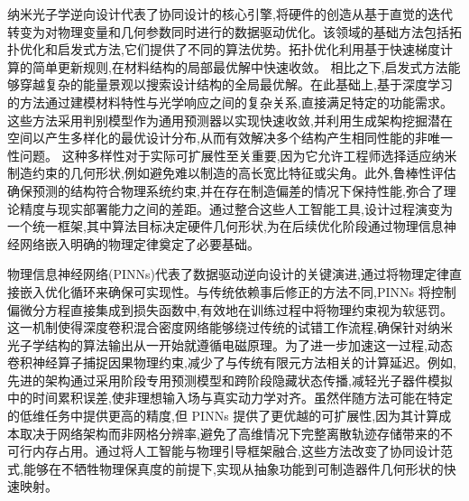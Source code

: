 \documentclass[11pt]{article}
\begin{document}
纳米光子学逆向设计代表了协同设计的核心引擎,将硬件的创造从基于直觉的迭代转变为对物理变量和几何参数同时进行的数据驱动优化。该领域的基础方法包括拓扑优化和启发式方法,它们提供了不同的算法优势。拓扑优化利用基于快速梯度计算的简单更新规则,在材料结构的局部最优解中快速收敛。\citep{doi_10_1115_1_4065902_bf83da4b} \citep{doi_10_32604_cmes_2024_052620_6f4a92ee} 相比之下,启发式方法能够穿越复杂的能量景观以搜索设计结构的全局最优解。在此基础上,基于深度学习的方法通过建模材料特性与光学响应之间的复杂关系,直接满足特定的功能需求。这些方法采用判别模型作为通用预测器以实现快速收敛,并利用生成架构挖掘潜在空间以产生多样化的最优设计分布,从而有效解决多个结构产生相同性能的非唯一性问题。\citep{doi_10_1364_cleo_at_2024_jth2a_48_87abd6b5} 这种多样性对于实际可扩展性至关重要,因为它允许工程师选择适应纳米制造约束的几何形状,例如避免难以制造的高长宽比特征或尖角。此外,鲁棒性评估确保预测的结构符合物理系统约束,并在存在制造偏差的情况下保持性能,弥合了理论精度与现实部署能力之间的差距。通过整合这些人工智能工具,设计过程演变为一个统一框架,其中算法目标决定硬件几何形状,为在后续优化阶段通过物理信息神经网络嵌入明确的物理定律奠定了必要基础。\citep{doi_10_1515_nanoph_2021_0660_2d91a441} \citep{doi_10_29026_oes_2022_210012_27973a69}

物理信息神经网络(PINNs)代表了数据驱动逆向设计的关键演进,通过将物理定律直接嵌入优化循环来确保可实现性。与传统依赖事后修正的方法不同,PINNs 将控制偏微分方程直接集成到损失函数中,有效地在训练过程中将物理约束视为软惩罚。\citep{doi_10_1007_s10444_023_10065_9_12bf0652} \citep{s2_cc39d5405a933620426d86298fa8fe4cd51915c5_27626ee3} 这一机制使得深度卷积混合密度网络能够绕过传统的试错工作流程,确保针对纳米光子学结构的算法输出从一开始就遵循电磁原理。为了进一步加速这一过程,动态卷积神经算子捕捉因果物理约束,减少了与传统有限元方法相关的计算延迟。例如,先进的架构通过采用阶段专用预测模型和跨阶段隐藏状态传播,减轻光子器件模拟中的时间累积误差,使非理想输入场与真实动力学对齐。虽然伴随方法可能在特定的低维任务中提供更高的精度,但 PINNs 提供了更优越的可扩展性,因为其计算成本取决于网络架构而非网格分辨率,避免了高维情况下完整离散轨迹存储带来的不可行内存占用。通过将人工智能与物理引导框架融合,这些方法改变了协同设计范式,能够在不牺牲物理保真度的前提下,实现从抽象功能到可制造器件几何形状的快速映射。\citep{doi_10_48550_arxiv_2406_17810_813bd2a3} \citep{s2_037e66f37189104d61c0d000de0cee202b7eec9e_d15b8018} \citep{doi_10_48550_arxiv_2606_12337_68b62bfa}
\end{document}
